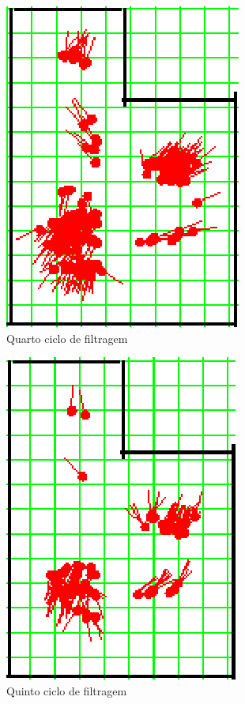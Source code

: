 \begin{figure}[H]
  \centering
  \includegraphics[scale=1]{figuras/cen1_ex3/5.eps}
  \caption[Quarto Ciclo de Filtragem]{Quarto ciclo de filtragem}
  \label{img:cen1_ex3_5}
\end{figure}

\begin{figure}[H]
  \centering
  \includegraphics[scale=1]{figuras/cen1_ex3/6.eps}
  \caption[Quinto Ciclo de Filtragem]{Quinto ciclo de filtragem}
  \label{img:cen1_ex3_6}
\end{figure}

